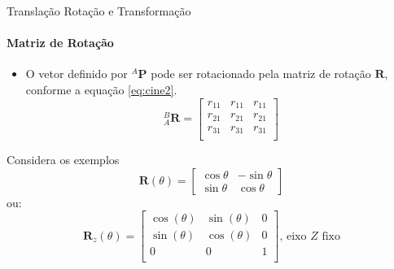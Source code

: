 \documentclass{beamer}
\begin{document}
\begin{frame}{Translação Rotação e Transformação}
  \framesubtitle{Matriz de Rotação}
  \begin{itemize}
    \item O vetor definido por ${}^A\mathbf{P}$ pode ser rotacionado pela matriz de rotação $\mathbf{R}$, conforme a equação \eqref{eq:cine2}.
    \begin{equation}\label{eq:cine2}
        {}_A^B
        \mathbf{R} = 
        \begin{bmatrix}
        r_{11} & r_{11} & r_{11}\\
        r_{21} & r_{21} & r_{21}\\
        r_{31} & r_{31} & r_{31}\\
        \end{bmatrix}
        \end{equation}
\end{itemize}

\begin{block}{Considera os exemplos}
    \begin{equation*}
        \mathbf{R}(\theta) = 
        \begin{bmatrix}
            \cos \theta &-\sin \theta \\\sin \theta &\cos \theta
        \end{bmatrix}
        \end{equation*}
    ou:
    \begin{equation*}
        \mathbf{R}_z(\theta) = 
        \begin{bmatrix}
        \cos(\theta) & \sin(\theta) & 0\\
        \sin(\theta) & \cos(\theta) & 0\\
        0 & 0 & 1\\ 
        \end{bmatrix} \text{, eixo $Z$ fixo}
        \end{equation*}
\end{block}

\end{frame}
\end{document}
